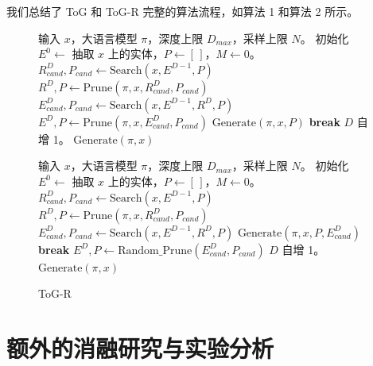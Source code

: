 \documentclass[11pt,UTF8,fontset=fandol]{ctexart}
\begin{document}
我们总结了 ToG 和 ToG-R 完整的算法流程，如算法 1 和算法 2 所示。

\begin{figure}[H]
\centering
\begin{minipage}[t]{0.49\textwidth}
\begin{algorithm}[H]
\caption{ToG}
\begin{algorithmic}[1]
\Require 输入 $x$，大语言模型 $\pi$，深度上限 $D_{max}$，采样上限 $N$。
\State 初始化 $E^0 \leftarrow$ 抽取 $x$ 上的实体，$P \leftarrow [\,]$，$M \leftarrow 0$。
  \State $R_{cand}^D, P_{cand} \leftarrow \text{Search}(x, E^{D-1}, P)$
  \State $R^D, P \leftarrow \text{Prune}(\pi, x, R_{cand}^D, P_{cand})$
  \State $E_{cand}^D, P_{cand} \leftarrow \text{Search}(x, E^{D-1}, R^D, P)$
  \State $E^D, P \leftarrow \text{Prune}(\pi, x, E_{cand}^D, P_{cand})$
    \State $\text{Generate}(\pi, x, P)$
    \State \textbf{break}
  \EndIf
  \State $D$ 自增 1。
\EndWhile
{}
  \State $\text{Generate}(\pi, x)$
\EndIf
\end{algorithmic}
\end{algorithm}
\end{minipage}
\hfill
\begin{minipage}[t]{0.49\textwidth}
\begin{algorithm}[H]
\caption{ToG-R}
\begin{algorithmic}[1]
\Require 输入 $x$，大语言模型 $\pi$，深度上限 $D_{max}$，采样上限 $N$。
\State 初始化 $E^0 \leftarrow$ 抽取 $x$ 上的实体，$P \leftarrow [\,]$，$M \leftarrow 0$。
  \State $R_{cand}^D, P_{cand} \leftarrow \text{Search}(x, E^{D-1}, P)$
  \State $R^D, P \leftarrow \text{Prune}(\pi, x, R_{cand}^D, P_{cand})$
  \State $E_{cand}^D, P_{cand} \leftarrow \text{Search}(x, E^{D-1}, R^D, P)$
    \State $\text{Generate}(\pi, x, P, E_{cand}^D)$
    \State \textbf{break}
  \EndIf
  \State $E^D, P \leftarrow \text{Random\_Prune}(E_{cand}^D, P_{cand})$
  \State $D$ 自增 1。
\EndWhile
{}
  \State $\text{Generate}(\pi, x)$
\EndIf
\end{algorithmic}
\end{algorithm}
\end{minipage}
\end{figure}

\section{额外的消融研究与实验分析}
\end{document}
